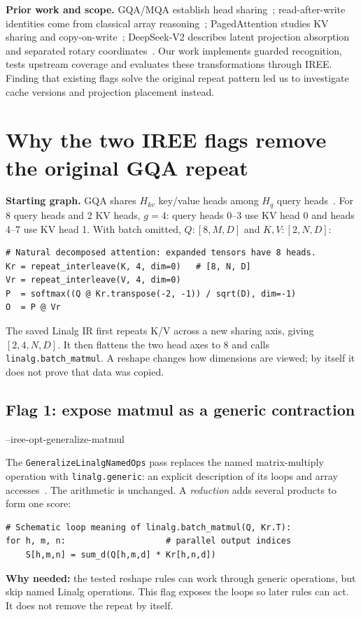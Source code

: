 \documentclass[10pt,a4paper]{article}
\newcommand{\code}[1]{\texttt{#1}}
\begin{document}
\textbf{Prior work and scope.} GQA/MQA establish head sharing~\cite{gqa,mqa}; read-after-write identities come from classical array reasoning~\cite{mccarthy,arrays}; PagedAttention studies KV sharing and copy-on-write~\cite{paged}; DeepSeek-V2 describes latent projection absorption and separated rotary coordinates~\cite{deepseek}. Our work implements guarded recognition, tests upstream coverage and evaluates these transformations through IREE. Finding that existing flags solve the original repeat pattern led us to investigate cache versions and projection placement instead.

\newpage
\section{Why the two IREE flags remove the original GQA repeat}
\textbf{Starting graph.} GQA shares $H_{kv}$ key/value heads among $H_q$ query heads~\cite{gqa,mqa}. For 8 query heads and 2 KV heads, $g=4$: query heads 0--3 use KV head 0 and heads 4--7 use KV head 1. With batch omitted, $Q:[8,M,D]$ and $K,V:[2,N,D]$:
\begin{lstlisting}
# Natural decomposed attention: expanded tensors have 8 heads.
Kr = repeat_interleave(K, 4, dim=0)   # [8, N, D]
Vr = repeat_interleave(V, 4, dim=0)
P  = softmax((Q @ Kr.transpose(-2, -1)) / sqrt(D), dim=-1)
O  = P @ Vr
\end{lstlisting}
The saved Linalg IR first repeats K/V across a new sharing axis, giving $[2,4,N,D]$. It then flattens the two head axes to 8 and calls \code{linalg.batch\_matmul}. A reshape changes how dimensions are viewed; by itself it does not prove that data was copied.

\subsection*{Flag 1: expose matmul as a generic contraction}
{\footnotesize\ttfamily --iree-opt-generalize-matmul\par}
The \code{GeneralizeLinalgNamedOps} pass replaces the named matrix-multiply operation with \code{linalg.generic}: an explicit description of its loops and array accesses~\cite{ireesource,ireedocs}. The arithmetic is unchanged. A \emph{reduction} adds several products to form one score:
\begin{lstlisting}
# Schematic loop meaning of linalg.batch_matmul(Q, Kr.T):
for h, m, n:                    # parallel output indices
    S[h,m,n] = sum_d(Q[h,m,d] * Kr[h,n,d])
\end{lstlisting}
\textbf{Why needed:} the tested reshape rules can work through generic operations, but skip named Linalg operations. This flag exposes the loops so later rules can act. It does not remove the repeat by itself.
\end{document}
